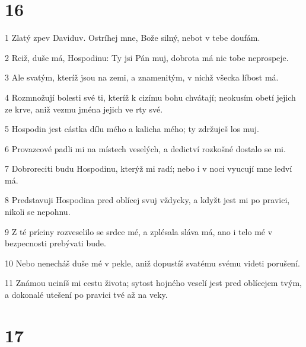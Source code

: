 \chapter{16}

\par 1 Zlatý zpev Daviduv. Ostríhej mne, Bože silný, nebot v tebe doufám.
\par 2 Rciž, duše má, Hospodinu: Ty jsi Pán muj, dobrota má nic tobe neprospeje.
\par 3 Ale svatým, kteríž jsou na zemi, a znamenitým, v nichž všecka líbost má.
\par 4 Rozmnožují bolesti své ti, kteríž k cizímu bohu chvátají; neokusím obetí jejich ze krve, aniž vezmu jména jejich ve rty své.
\par 5 Hospodin jest cástka dílu mého a kalicha mého; ty zdržuješ los muj.
\par 6 Provazcové padli mi na místech veselých, a dedictví rozkošné dostalo se mi.
\par 7 Dobroreciti budu Hospodinu, kterýž mi radí; nebo i v noci vyucují mne ledví má.
\par 8 Predstavuji Hospodina pred oblícej svuj vždycky, a kdyžt jest mi po pravici, nikoli se nepohnu.
\par 9 Z té príciny rozveselilo se srdce mé, a zplésala sláva má, ano i telo mé v bezpecnosti prebývati bude.
\par 10 Nebo nenecháš duše mé v pekle, aniž dopustíš svatému svému videti porušení.
\par 11 Známou uciníš mi cestu života; sytost hojného veselí jest pred oblícejem tvým, a dokonalé utešení po pravici tvé až na veky.

\chapter{17}

